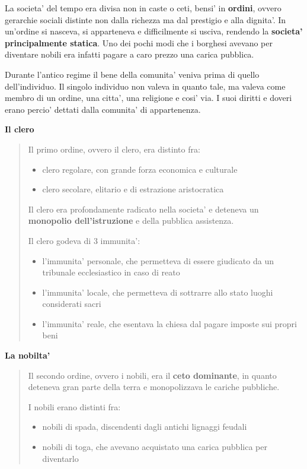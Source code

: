 \documentclass{article}
\begin{document}
{{    La societa' del tempo era divisa non in caste o ceti, bensi' in \textbf{ordini}, ovvero gerarchie sociali distinte non dalla richezza ma dal prestigio e alla dignita'. In un'ordine si nasceva, si apparteneva e difficilmente si usciva, rendendo la \textbf{societa' principalmente statica}. Uno dei pochi modi che i borghesi avevano per diventare nobili era infatti pagare a caro prezzo una carica pubblica.

    Durante l'antico regime il bene della comunita' veniva prima di quello dell'individuo. Il singolo individuo non valeva in quanto tale, ma valeva come membro di un ordine, una citta', una religione e cosi' via. I suoi diritti e doveri erano percio' dettati dalla comunita' di appartenenza.

    \textbf{Il clero}
    \begin{quote}
      Il primo ordine, ovvero il clero, era distinto fra:
      \begin{itemize}
        \item clero regolare, con grande forza economica e culturale
        \item clero secolare, elitario e di estrazione aristocratica
      \end{itemize}
      Il clero era profondamente radicato nella societa' e deteneva un \textbf{monopolio dell'istruzione} e della pubblica assistenza.

      Il clero godeva di 3 immunita':
      \begin{itemize}
        \item l'immunita' personale, che permetteva di essere giudicato da un tribunale ecclesiastico in caso di reato
        \item l'immunita' locale, che permetteva di sottrarre allo stato luoghi considerati sacri
        \item l'immunita' reale, che esentava la chiesa dal pagare imposte sui propri beni
      \end{itemize}
    \end{quote}

    \textbf{La nobilta'}
    \begin{quote}
      Il secondo ordine, ovvero i nobili, era il \textbf{ceto dominante}, in quanto deteneva gran parte della terra e monopolizzava le cariche pubbliche.

      I nobili erano distinti fra:
      \begin{itemize}
        \item nobili di spada, discendenti dagli antichi lignaggi feudali
        \item nobili di toga, che avevano acquistato una carica pubblica per diventarlo
      \end{itemize}


\end{quote}}}
\end{document}
